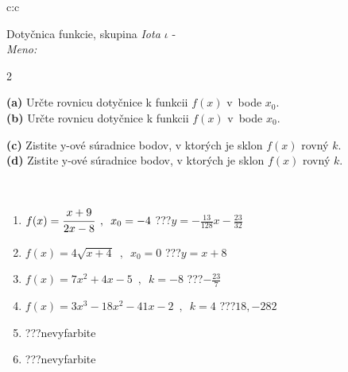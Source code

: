 \documentclass[10pt]{report}
\begin{document}
\begin{tabular}{c:c}
\begin{minipage}[c][104.5mm][t]{0.5\linewidth}
\begin{center}
\vspace{7mm}
{\huge Dotyčnica funkcie, skupina \textit{Iota $\iota$} -}\\[5mm]
\textit{Meno:}\phantom{xxxxxxxxxxxxxxxxxxxxxxxxxxxxxxxxxxxxxxxxxxxxxxxxxxxxxxxxxxxxxxxxx}\\[5mm]
\begin{minipage}{0.95\linewidth}
\begin{center}
{\small \begin{multicols}{2} \raggedright
\textbf{(a)} Určte rovnicu dotyčnice k funkcii \(f(x)\) v~bode \(x_0\). \\[1mm]
\textbf{(b)} Určte rovnicu dotyčnice k funkcii \(f(x)\) v~bode \(x_0\). \par \columnbreak
\textbf{(c)} Zistite y-ové súradnice bodov, v ktorých je sklon \(f(x)\) rovný \(k\). \\[1mm]
\textbf{(d)} Zistite y-ové súradnice bodov, v ktorých je sklon \(f(x)\) rovný \(k\). \\[1mm]
\end{multicols}
}
\end{center}
\end{minipage}
\\[4mm]
\begin{minipage}{0.79\linewidth}
\begin{center}
\begin{varwidth}{\linewidth}
\begin{enumerate}
\normalsizerr
\item $f(x)=\cfrac{x+9}{2x-8}\enspace , \enspace x_0=-4$\quad \dotfill\; ???\;\dotfill \quad $y = -\frac{13}{128}x-\frac{23}{32}$
\item $f(x)=4\sqrt{x+4}\enspace , \enspace x_0=0$\quad \dotfill\; ???\;\dotfill \quad $y = x+8$
\item $f(x)=7x^2+4x-5\enspace , \enspace k=-8$\quad \dotfill\; ???\;\dotfill \quad $-\frac{23}{7}$
\item $f(x)=3x^3-18x^2-41x-2\enspace , \enspace k=4$\quad \dotfill\; ???\;\dotfill \quad $18 , -282$
\item \quad \dotfill\; ???\;\dotfill \quad nevyfarbite
\item \quad \dotfill\; ???\;\dotfill \quad nevyfarbite
\end{enumerate}
\end{varwidth}

\end{center}
\end{minipage}
\end{center}
\end{minipage}
\end{tabular}
\end{document}
